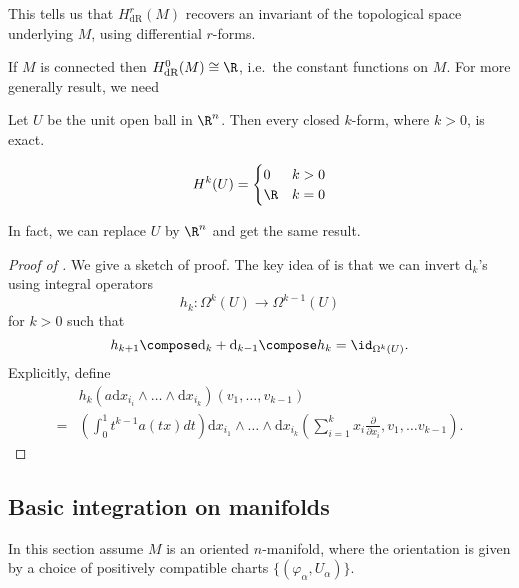 \documentclass[a4paper]{article}
\newcommand{\w}{\wedge}
\begin{document}
This tells us that \(H^r_{\text{dR}}(M)\) recovers an invariant of the topological space underlying \(M\), using differential \(r\)-forms.

If \(M\) is connected then \(H^0_{\text{dR}}(M) \cong \R\), i.e.\ the constant functions on \(M\). For more generally result, we need

\begin{theorem}
  \label{thm:Poincaré lemma}
  Let \(U\) be the unit open ball in \(\R^n\). Then every closed \(k\)-form, where \(k > 0\), is exact.
\end{theorem}

\begin{corollary}
  \[
    H^k(U) =
    \begin{cases}
      0 & k > 0 \\
      \R & k = 0
    \end{cases}
  \]
\end{corollary}

In fact, we can replace \(U\) by \(\R^n\) and get the same result.

\begin{proof}[Proof of ]
  We give a sketch of proof. The key idea of is that we can invert \(\mathrm d_k\)'s using integral operators
  \[
    h_k: \Omega^k(U) \to \Omega^{k - 1}(U)
  \]
  for \(k > 0\) such that
  \[
    h_{k + 1} \compose \mathrm d_k + \mathrm d_{k - 1} \compose h_k = \id_{\Omega^k(U)}.
  \]
  Explicitly, define
  \begin{align*}
    & h_k(a \mathrm dx_{i_i} \w \dots \w \mathrm dx_{i_k}) (v_1, \dots, v_{k - 1}) \\
    =& \left(\int_0^1 t^{k - 1} a(tx) dt \right) \mathrm d x_{i_1} \w \dots \w \mathrm dx_{i_k} \left(\sum_{i = 1}^k x_i \frac{\partial  }{\partial x_i}, v_1, \dots v_{k - 1}\right).
  \end{align*}
\end{proof}

\subsection{Basic integration on manifolds}

In this section assume \(M\) is an oriented \(n\)-manifold, where the orientation is given by a choice of positively compatible charts \(\{(\varphi_\alpha, U_\alpha)\}\).
\end{document}
